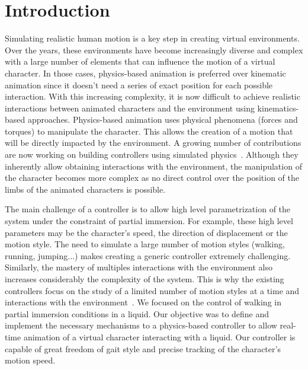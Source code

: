 \documentclass[conference]{acmsiggraph}
\begin{document}
\keywordlist


\section{Introduction}

Simulating realistic human motion is a key step in creating virtual environments. Over the years, these environments have become increasingly diverse and complex with a large number of elements that can influence the motion of a virtual character. In those cases, physics-based animation is preferred over kinematic animation since it doesn't need a series of exact position for each possible interaction. With this increasing complexity, it is now difficult to achieve realistic interactions between animated characters and the environment using kinematics-based approaches. Physics-based animation uses physical phenomena (forces and torques) to manipulate the character. This allows the creation of a motion that will be directly impacted by the environment. A growing number of contributions are now working on building controllers using simulated physics~\cite{geijtenbeek2012interactive}. Although they inherently allow obtaining interactions with the environment, the manipulation of the character becomes more complex as no direct control over the position of the limbs of the animated characters is possible.

The main challenge of a controller is to allow high level parametrization of the system under the constraint of partial immersion. For example, these high level parameters may be the character's speed, the direction of displacement or the motion style. The need to simulate a large number of motion styles (walking, running, jumping...) makes creating a generic controller extremely challenging. Similarly, the mastery of multiples interactions with the environment also increases considerably the complexity of the system. This is why the existing controllers focus on the study of a limited number of motion styles at a time and interactions with the environment~\cite{geijtenbeek2012interactive}. We focused on the control of walking in partial immersion conditions in a liquid. Our objective was to define and implement the necessary mechanisms to a physics-based controller to allow real-time animation of a virtual character interacting with a liquid. Our controller is capable of great freedom of gait style and precise tracking of the character's motion speed.
\end{document}
